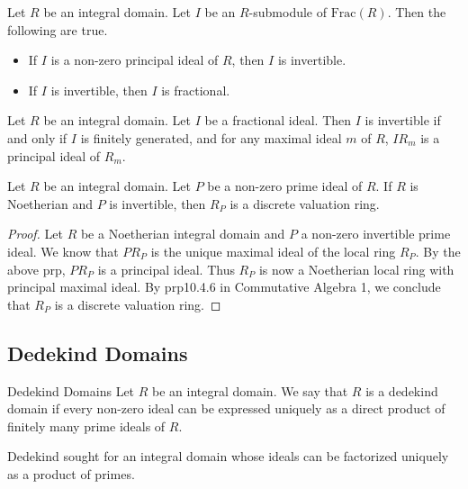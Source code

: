 \documentclass[a4paper]{article}
\begin{document}
\begin{prp}{}{} Let $R$ be an integral domain. Let $I$ be an $R$-submodule of $\text{Frac}(R)$. Then the following are true. 
\begin{itemize}
\item If $I$ is a non-zero principal ideal of $R$, then $I$ is invertible. 
\item If $I$ is invertible, then $I$ is fractional. 
\end{itemize}
\end{prp}

\begin{prp}{}{} Let $R$ be an integral domain. Let $I$ be a fractional ideal. Then $I$ is invertible if and only if $I$ is finitely generated, and for any maximal ideal $m$ of $R$, $IR_m$ is a principal ideal of $R_m$. 
\end{prp}

\begin{prp}{}{} Let $R$ be an integral domain. Let $P$ be a non-zero prime ideal of $R$. If $R$ is Noetherian and $P$ is invertible, then $R_P$ is a discrete valuation ring. \tcbline
\begin{proof}
Let $R$ be a Noetherian integral domain and $P$ a non-zero invertible prime ideal. We know that $PR_P$ is the unique maximal ideal of the local ring $R_P$. By the above prp, $PR_P$ is a principal ideal. Thus $R_P$ is now a Noetherian local ring with principal maximal ideal. By prp10.4.6 in Commutative Algebra 1, we conclude that $R_P$ is a discrete valuation ring. 
\end{proof}
\end{prp}

\subsection{Dedekind Domains}
\begin{defn}{Dedekind Domains}{} Let $R$ be an integral domain. We say that $R$ is a dedekind domain if every non-zero ideal can be expressed uniquely as a direct product of finitely many prime ideals of $R$. 
\end{defn}

Dedekind sought for an integral domain whose ideals can be factorized uniquely as a product of primes. 
\end{document}
